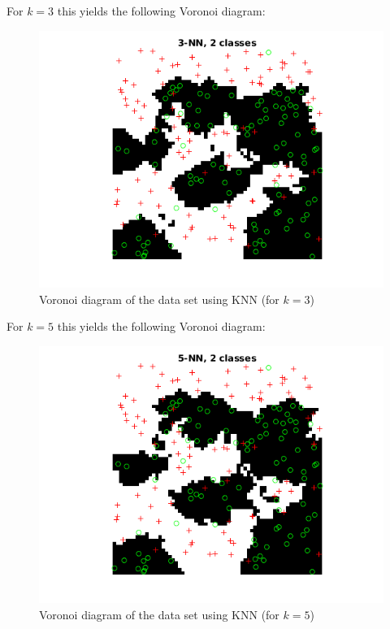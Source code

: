\documentclass[10pt]{article}
\begin{document}
For $k=3$ this yields the following Voronoi diagram:
\begin{figure}[H]
 \centering
 \includegraphics[width=\textwidth]{assign2_2_3.png}
 \caption{Voronoi diagram of the data set using KNN (for $k=3$)}
 \label{fig2.1b}
\end{figure}

For $k=5$ this yields the following Voronoi diagram:
\begin{figure}[H]
 \centering
 \includegraphics[width=\textwidth]{assign2_2_5.png}
 \caption{Voronoi diagram of the data set using KNN (for $k=5$)}
 \label{fig2.1c}
\end{figure}
\end{document}

